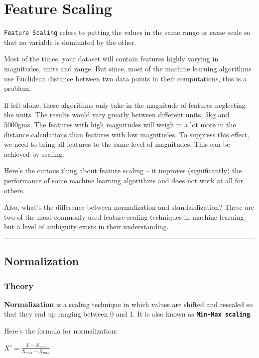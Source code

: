\documentclass[
  letterpaper,
  DIV=11,
  numbers=noendperiod]{scrreprt}
\begin{document}
\section{Feature Scaling}\label{feature-scaling}

\texttt{Feature\ Scaling} refers to putting the values in the same range
or same scale so that no variable is dominated by the other.

Most of the times, your dataset will contain features highly varying in
magnitudes, units and range. But since, most of the machine learning
algorithms use Euclidean distance between two data points in their
computations, this is a problem.

If left alone, these algorithms only take in the magnitude of features
neglecting the units. The results would vary greatly between different
units, 5kg and 5000gms. The features with high magnitudes will weigh in
a lot more in the distance calculations than features with low
magnitudes. To suppress this effect, we need to bring all features to
the same level of magnitudes. This can be achieved by scaling.

Here's the curious thing about feature scaling -- it improves
(significantly) the performance of some machine learning algorithms and
does not work at all for others.

Also, what's the difference between normalization and standardization?
These are two of the most commonly used feature scaling techniques in
machine learning but a level of ambiguity exists in their understanding.

\begin{center}\rule{0.5\linewidth}{0.5pt}\end{center}

\subsection{Normalization}\label{normalization}

\subsubsection{Theory}\label{theory}

\textbf{Normalization} is a scaling technique in which values are
shifted and rescaled so that they end up ranging between 0 and 1. It is
also known as \textbf{\texttt{Min-Max\ scaling}}.

Here's the formula for normalization:

\(X' = \frac{X-X_{min}}{X_{max} - X_{min}}\)
\end{document}

